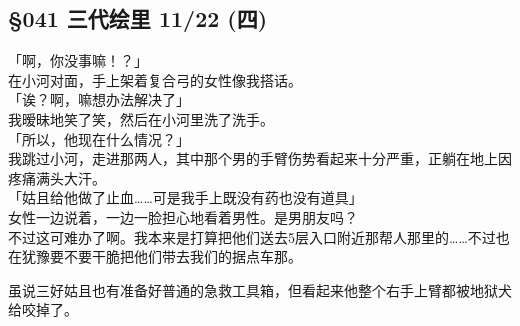\subsection{§041 三代绘里 11/22 (四)}

「啊，你没事嘛！？」\\

在小河对面，手上架着复合弓的女性像我搭话。\\

「诶？啊，嘛想办法解决了」\\

我暧昧地笑了笑，然后在小河里洗了洗手。\\

「所以，他现在什么情况？」\\

我跳过小河，走进那两人，其中那个男的手臂伤势看起来十分严重，正躺在地上因疼痛满头大汗。\\

「姑且给他做了止血……可是我手上既没有药也没有道具」\\

女性一边说着，一边一脸担心地看着男性。是男朋友吗？\\

不过这可难办了啊。我本来是打算把他们送去5层入口附近那帮人那里的……不过也在犹豫要不要干脆把他们带去我们的据点车那。

虽说三好姑且也有准备好普通的急救工具箱，但看起来他整个右手上臂都被地狱犬给咬掉了。

